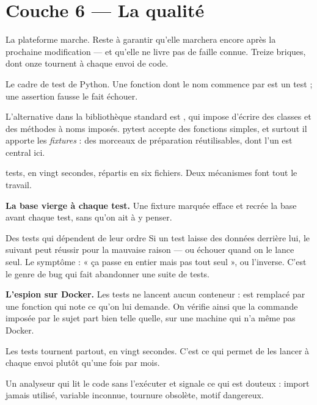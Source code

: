\chapter{Couche 6 — La qualité}

La plateforme marche. Reste à garantir qu'elle marchera encore après la
prochaine modification --- et qu'elle ne livre pas de faille connue. Treize
briques, dont onze tournent à chaque envoi de code.


\quoi
Le cadre de test de Python. Une fonction dont le nom commence par 
est un test ; une assertion fausse le fait échouer.

\pourquoi
L'alternative dans la bibliothèque standard est , qui impose
d'écrire des classes et des méthodes à noms imposés. pytest accepte des
fonctions simples, et surtout il apporte les \emph{fixtures} : des morceaux de
préparation réutilisables, dont l'un est central ici.

 tests, en vingt secondes, répartis en six fichiers. Deux mécanismes font
tout le travail.

\textbf{La base vierge à chaque test.} Une fixture marquée 
efface et recrée la base avant chaque test, sans qu'on ait à y penser.

\begin{piege}{Des tests qui dépendent de leur ordre}
Si un test laisse des données derrière lui, le suivant peut réussir pour la
mauvaise raison --- ou échouer quand on le lance seul. Le symptôme : « ça passe
en entier mais pas tout seul », ou l'inverse. C'est le genre de bug qui fait
abandonner une suite de tests.
\end{piege}

\textbf{L'espion sur Docker.} Les tests ne lancent aucun conteneur :
 est remplacé par une fonction qui note ce qu'on lui demande.
On vérifie ainsi que la commande imposée par le sujet part bien telle quelle,
sur une machine qui n'a même pas Docker.

\apport
Les tests tournent partout, en vingt secondes. C'est ce qui permet de les lancer
à chaque envoi plutôt qu'une fois par mois.


\quoi
Un analyseur qui lit le code sans l'exécuter et signale ce qui est douteux :
import jamais utilisé, variable inconnue, tournure obsolète, motif dangereux.

